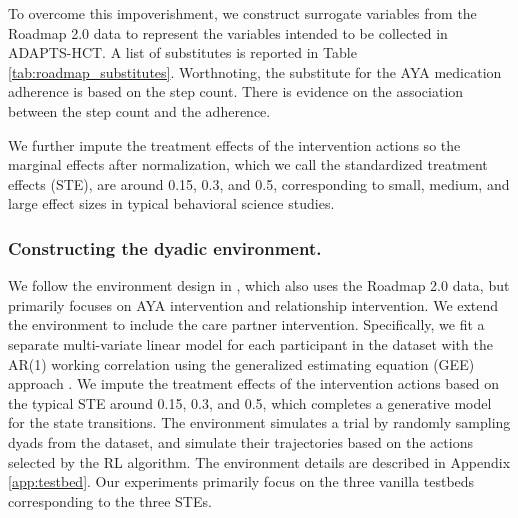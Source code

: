 To overcome this impoverishment, we construct surrogate variables from the Roadmap 2.0 data to represent the variables intended to be collected in ADAPTS-HCT. A list of substitutes is reported in Table \ref{tab:roadmap_substitutes}. Worthnoting, the substitute for the AYA medication adherence is based on the step count. There is evidence on the association between the step count and the adherence. 

We further impute the treatment effects of the intervention actions so the marginal effects after normalization, which we call the standardized treatment effects (STE), are around 0.15, 0.3, and 0.5, corresponding to small, medium, and large effect sizes in typical behavioral science studies.

\subsubsection{Constructing the dyadic environment.} We follow the environment design in \cite{li2023dyadic}, which also uses the Roadmap 2.0 data, but primarily focuses on AYA intervention and relationship intervention. We extend the environment to include the care partner intervention. Specifically, we fit a separate multi-variate linear model for each participant in the dataset with the AR(1) working correlation using the generalized estimating equation (GEE) approach \cite{ziegler2010generalized,hojsgaard2006r}. We impute the treatment effects of the intervention actions based on the typical STE around 0.15, 0.3, and 0.5, which completes a generative model for the state transitions. The environment simulates a trial by randomly sampling dyads from the dataset, and simulate their trajectories based on the actions selected by the RL algorithm. The environment details are described in Appendix \ref{app:testbed}. Our experiments primarily focus on the three vanilla testbeds corresponding to the three STEs.

